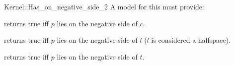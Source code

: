 \begin{ccRefFunctionObjectConcept}{Kernel::Has_on_negative_side_2}
A model for this must provide:


{returns true iff $p$ lies on the negative side of $c$.}

{returns true iff $p$ lies on the negative side of $l$ 
($l$ is considered a halfspace).}

{returns true iff $p$ lies on the negative side of $t$.}

\end{ccRefFunctionObjectConcept}
